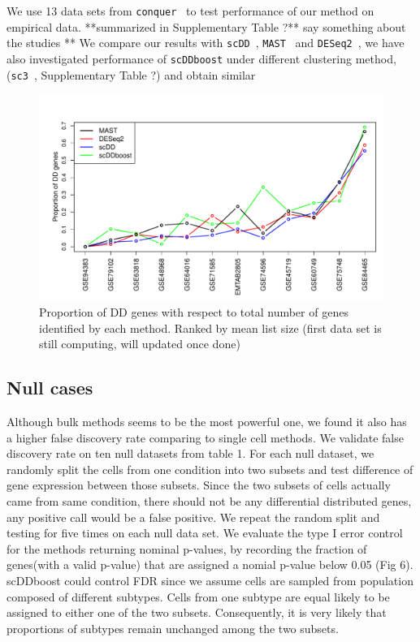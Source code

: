 \documentclass[aoas,preprint]{imsart}
\begin{document}
We use 13 data sets from \verb+conquer+~\citep{ref:Cq} to test 
performance of our method on empirical data. **summarized in Supplementary Table ?** say something about
the studies **  We compare our results with 
\verb+scDD+~\citep{ref:scDD}, \verb+MAST+~\citep{ref:MAST} and 
\verb+DESeq2+~\citep{ref:Des}, 
we have also investigated performance of \verb+scDDboost+ under different clustering 
method, (\verb+sc3+~\citep{sc3}, Supplementary Table ?)  and obtain similar 

\begin{figure}[H]
\includegraphics[width = 1\textwidth]{Figs/DD95.pdf}
 \caption{ Proportion of DD genes with respect to total number of genes identified by each method. Ranked by mean list size (first data set is still computing, will updated once done) }
  \label{fig:6}
\end{figure}




\subsection{Null cases}

Although bulk methods seems to be the most powerful one, we found it also has a higher false discovery rate comparing to single cell methods. We validate false discovery rate on ten null datasets from table 1. For each null dataset, we randomly split the cells from one condition into two subsets and test difference of gene expression between those subsets. Since the two subsets of cells actually came from same condition, there should not be any differential distributed genes, any positive call would be a false positive. We repeat the random split and testing for five times on each null data set. We evaluate the type I error control for the methods returning nominal p-values, by recording the fraction of genes(with a valid p-value) that are assigned a nomial p-value below 0.05 (Fig 6).\\
scDDboost could control FDR since we assume cells are sampled from population composed of different subtypes. Cells from one subtype are equal likely to be assigned to either one of the two subsets. Consequently, it is very likely that proportions of subtypes remain unchanged among the two subsets.
\end{document}
